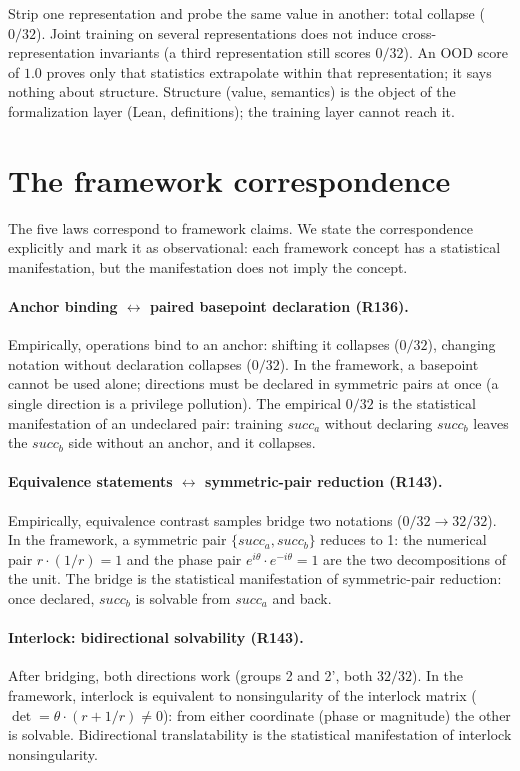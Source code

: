 \documentclass[sigplan,10pt,anonymous,review]{acmart}
\begin{document}
Strip one representation and probe the same value in another: total
collapse ($0/32$). Joint training on several representations does not
induce cross-representation invariants (a third representation still
scores $0/32$). An OOD score of $1.0$ proves only that statistics
extrapolate within that representation; it says nothing about
structure. Structure (value, semantics) is the object of the
formalization layer (Lean, definitions); the training layer cannot
reach it.

\section{The framework correspondence}

The five laws correspond to framework claims. We state the
correspondence explicitly and mark it as observational: each framework
concept has a statistical manifestation, but the manifestation does not
imply the concept.

\paragraph{Anchor binding $\leftrightarrow$ paired basepoint declaration (R136).}
Empirically, operations bind to an anchor: shifting it collapses
($0/32$), changing notation without declaration collapses ($0/32$).
In the framework, a basepoint cannot be used alone; directions must be
declared in symmetric pairs at once (a single direction is a privilege
pollution). The empirical $0/32$ is the statistical manifestation of
an undeclared pair: training $\mathit{succ}_a$ without declaring
$\mathit{succ}_b$ leaves the $\mathit{succ}_b$ side without an anchor,
and it collapses.

\paragraph{Equivalence statements $\leftrightarrow$ symmetric-pair reduction (R143).}
Empirically, equivalence contrast samples bridge two notations
($0/32 \to 32/32$). In the framework, a symmetric pair
$\{\mathit{succ}_a, \mathit{succ}_b\}$ reduces to 1: the numerical pair
$r \cdot (1/r) = 1$ and the phase pair $e^{i\theta} \cdot e^{-i\theta}
= 1$ are the two decompositions of the unit. The bridge is the
statistical manifestation of symmetric-pair reduction: once declared,
$\mathit{succ}_b$ is solvable from $\mathit{succ}_a$ and back.

\paragraph{Interlock: bidirectional solvability (R143).}
After bridging, both directions work (groups 2 and 2', both $32/32$).
In the framework, interlock is equivalent to nonsingularity of the
interlock matrix ($\det = \theta \cdot (r + 1/r) \neq 0$): from either
coordinate (phase or magnitude) the other is solvable. Bidirectional
translatability is the statistical manifestation of interlock
nonsingularity.
\end{document}

